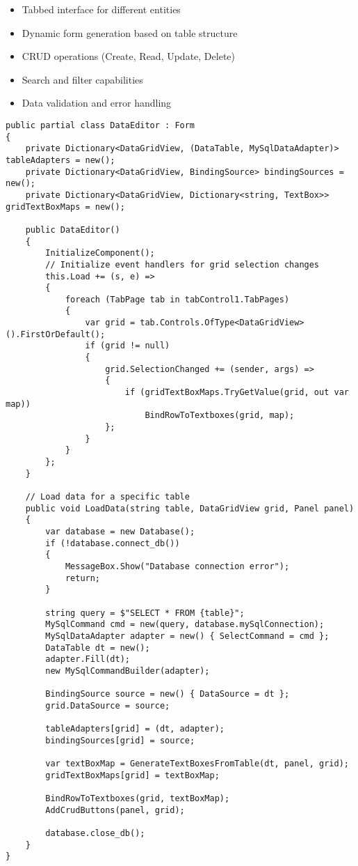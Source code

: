 \documentclass[a4paper,12pt]{article}
\begin{document}
\begin{itemize}
    \item Tabbed interface for different entities
    \item Dynamic form generation based on table structure
    \item CRUD operations (Create, Read, Update, Delete)
    \item Search and filter capabilities
    \item Data validation and error handling
\end{itemize}

\begin{lstlisting}[language=CSharp, caption=Data Editor Form Implementation]
public partial class DataEditor : Form
{
    private Dictionary<DataGridView, (DataTable, MySqlDataAdapter)> tableAdapters = new();
    private Dictionary<DataGridView, BindingSource> bindingSources = new();
    private Dictionary<DataGridView, Dictionary<string, TextBox>> gridTextBoxMaps = new();

    public DataEditor()
    {
        InitializeComponent();
        // Initialize event handlers for grid selection changes
        this.Load += (s, e) =>
        {
            foreach (TabPage tab in tabControl1.TabPages)
            {
                var grid = tab.Controls.OfType<DataGridView>().FirstOrDefault();
                if (grid != null)
                {
                    grid.SelectionChanged += (sender, args) =>
                    {
                        if (gridTextBoxMaps.TryGetValue(grid, out var map))
                            BindRowToTextboxes(grid, map);
                    };
                }
            }
        };
    }

    // Load data for a specific table
    public void LoadData(string table, DataGridView grid, Panel panel)
    {
        var database = new Database();
        if (!database.connect_db())
        {
            MessageBox.Show("Database connection error");
            return;
        }

        string query = $"SELECT * FROM {table}";
        MySqlCommand cmd = new(query, database.mySqlConnection);
        MySqlDataAdapter adapter = new() { SelectCommand = cmd };
        DataTable dt = new();
        adapter.Fill(dt);
        new MySqlCommandBuilder(adapter);

        BindingSource source = new() { DataSource = dt };
        grid.DataSource = source;

        tableAdapters[grid] = (dt, adapter);
        bindingSources[grid] = source;

        var textBoxMap = GenerateTextBoxesFromTable(dt, panel, grid);
        gridTextBoxMaps[grid] = textBoxMap;

        BindRowToTextboxes(grid, textBoxMap);
        AddCrudButtons(panel, grid);

        database.close_db();
    }
}
\end{lstlisting}
\end{document}
